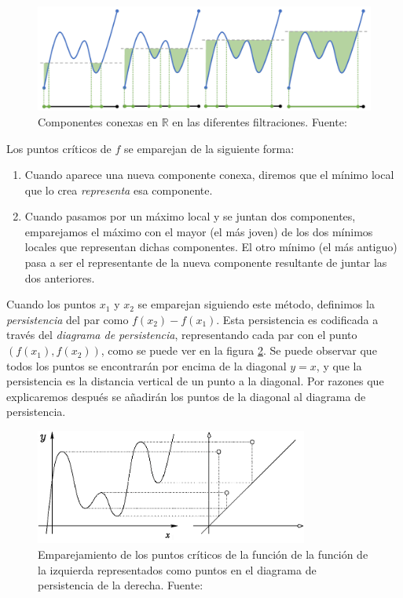 \begin{figure}[!ht]
\centering
\includegraphics[width=\textwidth]{include/figuras/Sub-level Filtrations.png} 
\caption{Componentes conexas en $\mathbb{R}$ en las diferentes filtraciones. Fuente: \cite{presentacionJustin}}
\label{ref:subnivelR}
\end{figure}

Los puntos críticos de $f$ se emparejan de la siguiente forma: 
\begin{enumerate}
	\item Cuando aparece una nueva componente conexa, diremos que el mínimo local que lo crea \emph{representa} esa componente.  
	\item Cuando pasamos por un máximo local y se juntan dos componentes, emparejamos el máximo con el mayor (el más joven) de los dos mínimos locales que representan dichas componentes. El otro mínimo (el más antiguo) pasa a ser el representante de la nueva componente resultante de juntar las dos anteriores.
\end{enumerate}

Cuando los puntos $x_1$ y $x_2$ se emparejan siguiendo este método, definimos la \emph{persistencia} del par como $f(x_2) - f(x_1)$. Esta persistencia es codificada a través del \emph{diagrama de persistencia}, representando cada par con el punto $(f(x_1),f(x_2))$, como se puede ver en la figura \ref{ref:persistenciaR}. Se puede observar que todos los puntos se encontrarán por encima de la diagonal $y=x$, y que la persistencia es la distancia vertical de un punto a la diagonal. Por razones que explicaremos después se añadirán los puntos de la diagonal al diagrama de persistencia. 

\begin{figure}[!ht]
\centering
\includegraphics[width=0.8\textwidth]{include/figuras/diagramaR.png} 
\caption{Emparejamiento de los puntos críticos de la función de la función de la izquierda representados como puntos en el diagrama de persistencia de la derecha. Fuente: \cite{articuloPersistenciaEH}}
\label{ref:persistenciaR}
\end{figure}

